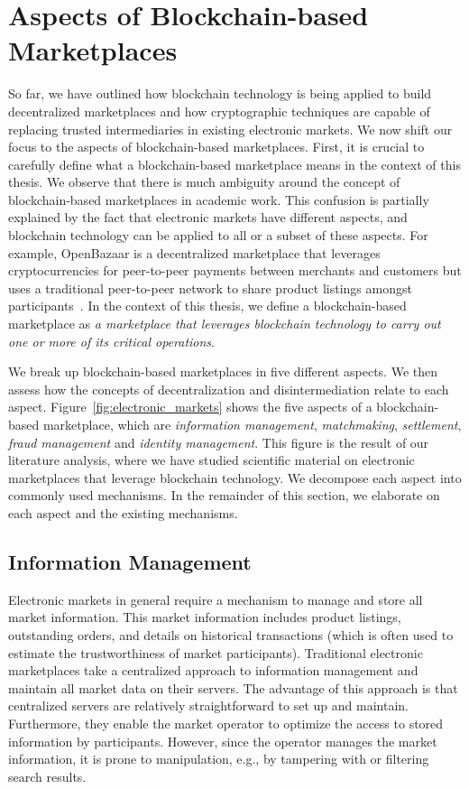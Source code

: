 \section{Aspects of Blockchain-based Marketplaces}
So far, we have outlined how blockchain technology is being applied to build decentralized marketplaces and how cryptographic techniques are capable of replacing trusted intermediaries in existing electronic markets.
We now shift our focus to the aspects of blockchain-based marketplaces.
First, it is crucial to carefully define what a blockchain-based marketplace means in the context of this thesis.
We observe that there is much ambiguity around the concept of blockchain-based marketplaces in academic work.
This confusion is partially explained by the fact that electronic markets have different aspects, and blockchain technology can be applied to all or a subset of these aspects.
For example, OpenBazaar is a decentralized marketplace that leverages cryptocurrencies for peer-to-peer payments between merchants and customers but uses a traditional peer-to-peer network to share product listings amongst participants~\cite{openbazaar}.
In the context of this thesis, we define a blockchain-based marketplace as \emph{a marketplace that leverages blockchain technology to carry out one or more of its critical operations}.

We break up blockchain-based marketplaces in five different aspects.
We then assess how the concepts of decentralization and disintermediation relate to each aspect.
Figure~\ref{fig:electronic_markets} shows the five aspects of a blockchain-based marketplace, which are \emph{information management}, \emph{matchmaking}, \emph{settlement}, \emph{fraud management} and \emph{identity management}.
This figure is the result of our literature analysis, where we have studied scientific material on electronic marketplaces that leverage blockchain technology.
We decompose each aspect into commonly used mechanisms.
In the remainder of this section, we elaborate on each aspect and the existing mechanisms.

\subsection{Information Management}
Electronic markets in general require a mechanism to manage and store all market information.
This market information includes product listings, outstanding orders, and details on historical transactions (which is often used to estimate the trustworthiness of market participants).
Traditional electronic marketplaces take a centralized approach to information management and maintain all market data on their servers.
The advantage of this approach is that centralized servers are relatively straightforward to set up and maintain.
Furthermore, they enable the market operator to optimize the access to stored information by participants.
However, since the operator manages the market information, it is prone to manipulation, e.g., by tampering with or filtering search results.

